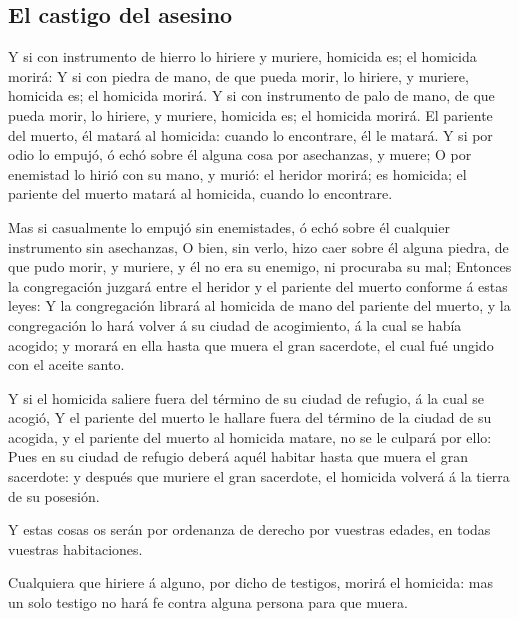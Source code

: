 \hypertarget{el-castigo-del-asesino}{%
\subsection{El castigo del asesino}\label{el-castigo-del-asesino}}

 Y si con instrumento de hierro lo hiriere y muriere,
homicida es; el homicida morirá:  Y si con piedra de
mano, de que pueda morir, lo hiriere, y muriere, homicida es; el
homicida morirá.  Y si con instrumento de palo de mano,
de que pueda morir, lo hiriere, y muriere, homicida es; el homicida
morirá.  El pariente del muerto, él matará al homicida:
cuando lo encontrare, él le matará.  Y si por odio lo
empujó, ó echó sobre él alguna cosa por asechanzas, y muere;
 O por enemistad lo hirió con su mano, y murió: el
heridor morirá; es homicida; el pariente del muerto matará al homicida,
cuando lo encontrare.

 Mas si casualmente lo empujó sin enemistades, ó echó
sobre él cualquier instrumento sin asechanzas,  O bien,
sin verlo, hizo caer sobre él alguna piedra, de que pudo morir, y
muriere, y él no era su enemigo, ni procuraba su mal; 
Entonces la congregación juzgará entre el heridor y el pariente del
muerto conforme á estas leyes:  Y la congregación librará
al homicida de mano del pariente del muerto, y la congregación lo hará
volver á su ciudad de acogimiento, á la cual se había acogido; y morará
en ella hasta que muera el gran sacerdote, el cual fué ungido con el
aceite santo.

 Y si el homicida saliere fuera del término de su ciudad
de refugio, á la cual se acogió,  Y el pariente del
muerto le hallare fuera del término de la ciudad de su acogida, y el
pariente del muerto al homicida matare, no se le culpará por ello:
 Pues en su ciudad de refugio deberá aquél habitar hasta
que muera el gran sacerdote: y después que muriere el gran sacerdote, el
homicida volverá á la tierra de su posesión.

 Y estas cosas os serán por ordenanza de derecho por
vuestras edades, en todas vuestras habitaciones.

 Cualquiera que hiriere á alguno, por dicho de testigos,
morirá el homicida: mas un solo testigo no hará fe contra alguna persona
para que muera.

